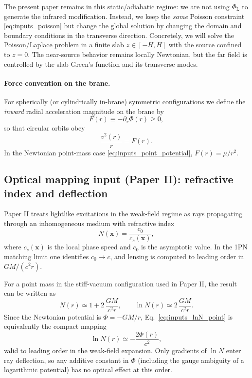 \documentclass[11pt]{article}
\newcommand{\PhiL}{\Phi_{\mathrm{L}}}
\begin{document}
The present paper remains in this static/adiabatic regime: we are not using $\PhiL$ to generate the
infrared modification.  Instead, we keep the \emph{same} Poisson constraint
\eqref{eq:inputs_poisson} but change the global solution by changing the domain and boundary
conditions in the transverse direction.  Concretely, we will solve the Poisson/Laplace problem in a
finite slab $z\in[-H,H]$ with the source confined to $z=0$.  The near-source behavior remains
locally Newtonian, but the far field is controlled by the slab Green's function and its transverse
modes.

\paragraph{Force convention on the brane.}
For spherically (or cylindrically in-brane) symmetric configurations we define the \emph{inward}
radial acceleration magnitude on the brane by
\begin{equation}
  F(r) \equiv -\partial_r \Phi(r)\ge 0,
\end{equation}
so that circular orbits obey
\begin{equation}
  \frac{v^2(r)}{r} = F(r).
\end{equation}
In the Newtonian point-mass case \eqref{eq:inputs_point_potential}, $F(r)=\mu/r^2$.

\subsection{Optical mapping input (Paper II): refractive index and deflection}
Paper II treats lightlike excitations in the weak-field regime as rays propagating through an
inhomogeneous medium with refractive index
\begin{equation}
  N(\mathbf{x}) = \frac{c_0}{c_s(\mathbf{x})},
\end{equation}
where $c_s(\mathbf{x})$ is the local phase speed and $c_0$ is the asymptotic value.
In the 1PN matching limit one identifies $c_0\to c$, and lensing is computed to leading order in
$GM/(c^2 r)$.

For a point mass in the stiff-vacuum configuration used in Paper II, the result can be written as
\begin{equation}
  N(r) \simeq 1 + 2\,\frac{GM}{c^2 r},
  \qquad
  \ln N(r) \simeq 2\,\frac{GM}{c^2 r}.
  \label{eq:inputs_lnN_point}
\end{equation}
Since the Newtonian potential is $\Phi=-GM/r$, Eq.~\eqref{eq:inputs_lnN_point} is equivalently the
compact mapping
\begin{equation}
  \ln N(r) \simeq -\frac{2\Phi(r)}{c^2},
  \label{eq:inputs_lnN_general}
\end{equation}
valid to leading order in the weak-field expansion.
Only gradients of $\ln N$ enter ray deflection, so any additive constant in $\Phi$ (including the
gauge ambiguity of a logarithmic potential) has no optical effect at this order.
\end{document}
